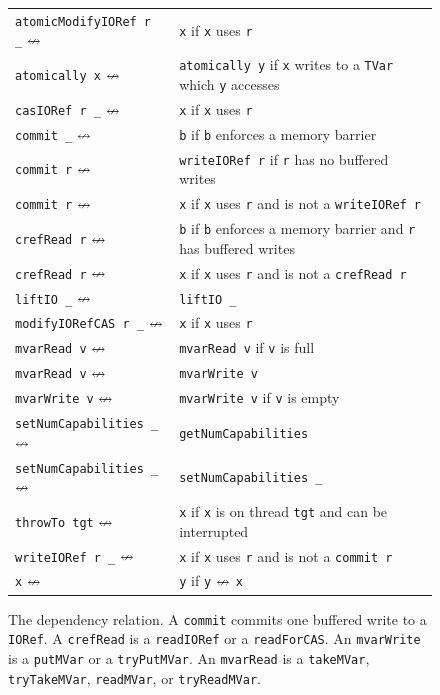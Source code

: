 \begin{figure}
  \centering
  \footnotesize
  \begin{tabular}{R{4cm}@{\hspace{0.5em}}L{8cm}}
    \texttt{atomicModifyIORef r \_} $\nleftrightarrow$& \texttt{x}
      \hfill if \texttt{x} uses \texttt{r} \\
    \texttt{atomically x} $\nleftrightarrow$& \texttt{atomically y}
      \hfill if \texttt{x} writes to a \texttt{TVar} which \texttt{y} accesses \\
    \texttt{casIORef r \_} $\nleftrightarrow$& \texttt{x}
      \hfill if \texttt{x} uses \texttt{r} \\
    \texttt{commit \_} $\nleftrightarrow$& \texttt{b}
      \hfill if \texttt{b} enforces a memory barrier \\
    \texttt{commit r} $\nleftrightarrow$& \texttt{writeIORef r}
      \hfill if \texttt{r} has no buffered writes \\
    \texttt{commit r} $\nleftrightarrow$& \texttt{x}
      \hfill if \texttt{x} uses \texttt{r} and is not a \texttt{writeIORef r} \\
    \texttt{crefRead r} $\nleftrightarrow$& \texttt{b}
      \hfill if \texttt{b} enforces a memory barrier and \texttt{r} has buffered writes \\
    \texttt{crefRead r} $\nleftrightarrow$& \texttt{x}
      \hfill if \texttt{x} uses \texttt{r} and is not a \texttt{crefRead r} \\
    \texttt{liftIO \_} $\nleftrightarrow$& \texttt{liftIO \_} \\
    \texttt{modifyIORefCAS r \_} $\nleftrightarrow$& \texttt{x}
      \hfill if \texttt{x} uses \texttt{r} \\
    \texttt{mvarRead v} $\nleftrightarrow$& \texttt{mvarRead v}
      \hfill if \texttt{v} is full \\
    \texttt{mvarRead v} $\nleftrightarrow$& \texttt{mvarWrite v} \\
    \texttt{mvarWrite v} $\nleftrightarrow$& \texttt{mvarWrite v}
      \hfill if \texttt{v} is empty \\
    \texttt{setNumCapabilities \_} $\nleftrightarrow$& \texttt{getNumCapabilities} \\
    \texttt{setNumCapabilities \_} $\nleftrightarrow$& \texttt{setNumCapabilities \_} \\
    \texttt{throwTo tgt} $\nleftrightarrow$& \texttt{x}
      \hfill if \texttt{x} is on thread \texttt{tgt} and can be interrupted \\
    \texttt{writeIORef r \_} $\nleftrightarrow$& \texttt{x}
      \hfill if \texttt{x} uses \texttt{r} and is not a \texttt{commit r} \\
    \texttt{x} $\nleftrightarrow$& \texttt{y}
      \hfill if \texttt{y} $\nleftrightarrow$ \texttt{x}
  \end{tabular}
  \caption[The \dejafu{} dependency relation.]{The \dejafu{} dependency relation.  A \texttt{commit} commits one buffered write to a \texttt{IORef}.  A \texttt{crefRead} is a \texttt{readIORef} or a \texttt{readForCAS}.  An \texttt{mvarWrite} is a \texttt{putMVar} or a \texttt{tryPutMVar}.  An \texttt{mvarRead} is a \texttt{takeMVar}, \texttt{tryTakeMVar}, \texttt{readMVar}, or \texttt{tryReadMVar}.}\label{fig:deprel}
\end{figure}

